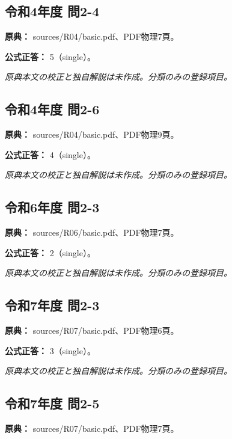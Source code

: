 \subsection{令和4年度 問2-4}
\label{q:r04-reg-basic-2-4}

\noindent\textbf{原典：} sources/R04/basic.pdf、PDF物理7頁。

\textbf{公式正答：} 5（single）。

\par\textit{原典本文の校正と独自解説は未作成。分類のみの登録項目。}

\subsection{令和4年度 問2-6}
\label{q:r04-reg-basic-2-6}

\noindent\textbf{原典：} sources/R04/basic.pdf、PDF物理9頁。

\textbf{公式正答：} 4（single）。

\par\textit{原典本文の校正と独自解説は未作成。分類のみの登録項目。}

\subsection{令和6年度 問2-3}
\label{q:r06-reg-basic-2-3}

\noindent\textbf{原典：} sources/R06/basic.pdf、PDF物理7頁。

\textbf{公式正答：} 2（single）。

\par\textit{原典本文の校正と独自解説は未作成。分類のみの登録項目。}

\subsection{令和7年度 問2-3}
\label{q:r07-reg-basic-2-3}

\noindent\textbf{原典：} sources/R07/basic.pdf、PDF物理6頁。

\textbf{公式正答：} 3（single）。

\par\textit{原典本文の校正と独自解説は未作成。分類のみの登録項目。}

\subsection{令和7年度 問2-5}
\label{q:r07-reg-basic-2-5}

\noindent\textbf{原典：} sources/R07/basic.pdf、PDF物理7頁。

